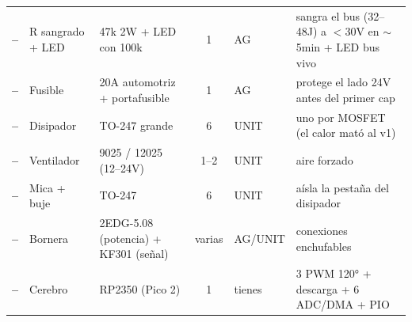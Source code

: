 \documentclass[10pt]{article}
\begin{document}
{\begin{tabular}{@{}>{\bfseries}l l l c l p{6.2cm}@{}}
--       & R sangrado + LED   & 47k 2W + LED con 100k                 & 1 & AG       & sangra el bus (32--48J) a $<$30V en $\sim$5min + LED bus vivo \\
--       & Fusible            & 20A automotriz + portafusible         & 1 & AG       & protege el lado 24V antes del primer cap \\
--       & Disipador          & TO-247 grande                         & 6 & UNIT     & uno por MOSFET (el calor mató al v1) \\
--       & Ventilador         & 9025 / 12025 (12--24V)                & 1--2 & UNIT   & aire forzado \\
--       & Mica + buje        & TO-247                                & 6 & UNIT     & aísla la pestaña del disipador \\
--       & Bornera            & 2EDG-5.08 (potencia) + KF301 (señal)  & varias & AG/UNIT & conexiones enchufables \\
--       & Cerebro            & RP2350 (Pico 2)                       & 1 & tienes   & 3 PWM 120° + descarga + 6 ADC/DMA + PIO \\
\bottomrule
\end{tabular}}

\vspace{1.5mm}
\end{document}
